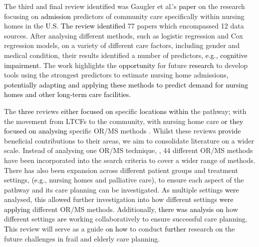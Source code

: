 \documentclass[../thesis.tex]{subfiles}
\begin{document}
The third and final review identified was Gaugler et al.'s \cite{Gaugler} \textcolor{black}{paper} on the research focusing on \textcolor{black}{admission} predictors of community care specifically within nursing homes in the \textcolor{black}{U.S.} \textcolor{black}{The review identified} 77 papers which encompassed 12 data sources. After analysing different methods, such as logistic regression and Cox regression models, on a variety of different care factors, including gender and medical condition, their results identified a number of predictors\textcolor{black}{, e.g., cognitive impairment.} The work highlights the \textcolor{black}{opportunity} for future \textcolor{black}{research} to develop tools using the strongest predictors to estimate nursing home admissions\textcolor{black}{, potentially adapting and applying these methods to predict demand for nursing homes and other long-term care facilities.}

The \textcolor{black}{three} reviews \textcolor{black}{either focused on} specific \textcolor{black}{locations within} the pathway\textcolor{black}{;} \cite{Freeman} with the movement from LTCFs to the community, \cite{Gaugler} with nursing home care \textcolor{black}{or they focused on analysing} specific OR/MS method\textcolor{black}{s \cite{Berntsen}}. Whilst these reviews \textcolor{black}{provide} beneficial contributions to their areas, we aim to consolidate literature on a wider scale. Instead of analysing one OR/MS technique, \cite{Berntsen}, 44 different OR/MS methods have been incorporated into the search criteria to cover a wider range of methods. There has also been expansion across different patient groups and treatment settings, \textcolor{black}{(e.g.}, nursing homes and palliative care\textcolor{black}{)}, to ensure each aspect of the pathway and its care planning can be investigated. As multiple settings \textcolor{black}{were} analysed, this allow\textcolor{black}{ed} further investigation into how different settings \textcolor{black}{were applying} different OR/MS methods. Additionally, \textcolor{black}{there was analysis on} how different settings \textcolor{black}{are} working collaboratively to ensure successful care planning. \textcolor{black}{T}his review will serve as a guide \textcolor{black}{on how} to conduct \textcolor{black}{further} research on the future challenges in frail and elderly care planning.  
\end{document}
